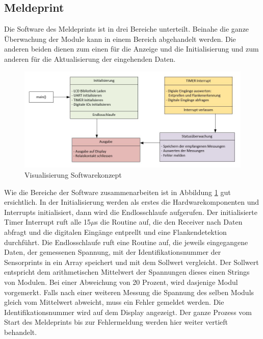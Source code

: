 
\subsection{Meldeprint}
Die Software des Meldeprints ist in drei Bereiche unterteilt. Beinahe die ganze Überwachung der Module kann in einem Bereich abgehandelt werden. Die anderen beiden dienen zum einen für die Anzeige und die Initialisierung und zum anderen für die Aktualisierung der eingehenden Daten.

\begin{figure}[htbp] 
  \centering
     \includegraphics[width=1\textwidth]{graphics/reportboard-software-river}
  \caption{Visualisierung Softwarekonzept}
  \label{fig:reportboard-software-river}
\end{figure}

Wie die Bereiche der Software zusammenarbeiten ist in Abbildung \ref{fig:reportboard-software-river} gut ersichtlich. In der Initialisierung werden als erstes die Hardwarekomponenten und Interrupts initialisiert, dann wird die Endlosschlaufe aufgerufen.
\newline
Der initialisierte Timer Interrupt ruft alle 15$\mu$s die Routine auf, die den Receiver nach Daten abfragt und die digitalen Eingänge entprellt und eine Flankendetektion durchführt.
\newline
Die Endlosschlaufe ruft eine Routine auf, die jeweils eingegangene Daten, der gemessenen Spannung, mit der Identifikationsnummer der Sensorprints in ein Array speichert und mit dem Sollwert vergleicht. Der Sollwert entspricht dem arithmetischen Mittelwert der Spannungen dieses einen Strings von Modulen. Bei einer Abweichung von 20 Prozent, wird dasjenige Modul vorgemerkt. Falls nach einer weiteren Messung die Spannung des selben Moduls gleich vom Mittelwert abweicht, muss ein Fehler gemeldet werden. Die Identifikationsnummer wird auf dem Display angezeigt. Der ganze Prozess vom Start des Meldeprints bis zur Fehlermeldung werden hier weiter vertieft behandelt.

